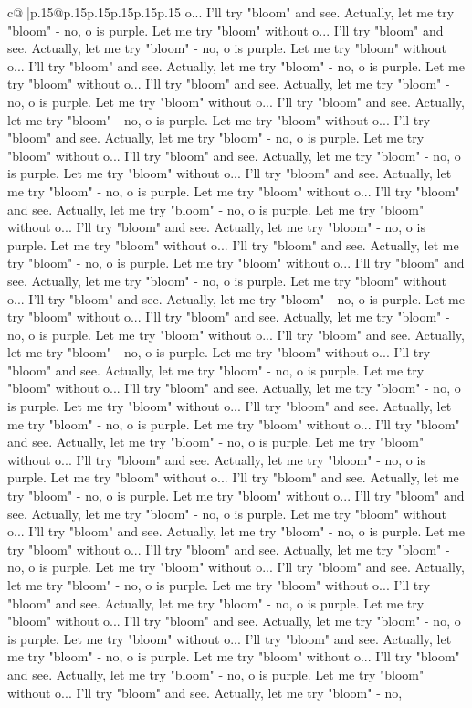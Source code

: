 \documentclass{article}
\begin{document}
{\begin{supertabular}{c@{$\;$}|p{.15\linewidth}@{}p{.15\linewidth}p{.15\linewidth}p{.15\linewidth}p{.15\linewidth}p{.15\linewidth}}
{{{o... I'll try "bloom" and see. Actually, let me try "bloom" {-} no, o is purple. Let me try "bloom" without o... I'll try "bloom" and see. Actually, let me try "bloom" {-} no, o is purple. Let me try "bloom" without o... I'll try "bloom" and see. Actually, let me try "bloom" {-} no, o is purple. Let me try "bloom" without o... I'll try "bloom" and see. Actually, let me try "bloom" {-} no, o is purple. Let me try "bloom" without o... I'll try "bloom" and see. Actually, let me try "bloom" {-} no, o is purple. Let me try "bloom" without o... I'll try "bloom" and see. Actually, let me try "bloom" {-} no, o is purple. Let me try "bloom" without o... I'll try "bloom" and see. Actually, let me try "bloom" {-} no, o is purple. Let me try "bloom" without o... I'll try "bloom" and see. Actually, let me try "bloom" {-} no, o is purple. Let me try "bloom" without o... I'll try "bloom" and see. Actually, let me try "bloom" {-} no, o is purple. Let me try "bloom" without o... I'll try "bloom" and see. Actually, let me try "bloom" {-} no, o is purple. Let me try "bloom" without o... I'll try "bloom" and see. Actually, let me try "bloom" {-} no, o is purple. Let me try "bloom" without o... I'll try "bloom" and see. Actually, let me try "bloom" {-} no, o is purple. Let me try "bloom" without o... I'll try "bloom" and see. Actually, let me try "bloom" {-} no, o is purple. Let me try "bloom" without o... I'll try "bloom" and see. Actually, let me try "bloom" {-} no, o is purple. Let me try "bloom" without o... I'll try "bloom" and see. Actually, let me try "bloom" {-} no, o is purple. Let me try "bloom" without o... I'll try "bloom" and see. Actually, let me try "bloom" {-} no, o is purple. Let me try "bloom" without o... I'll try "bloom" and see. Actually, let me try "bloom" {-} no, o is purple. Let me try "bloom" without o... I'll try "bloom" and see. Actually, let me try "bloom" {-} no, o is purple. Let me try "bloom" without o... I'll try "bloom" and see. Actually, let me try "bloom" {-} no, o is purple. Let me try "bloom" without o... I'll try "bloom" and see. Actually, let me try "bloom" {-} no, o is purple. Let me try "bloom" without o... I'll try "bloom" and see. Actually, let me try "bloom" {-} no, o is purple. Let me try "bloom" without o... I'll try "bloom" and see. Actually, let me try "bloom" {-} no, o is purple. Let me try "bloom" without o... I'll try "bloom" and see. Actually, let me try "bloom" {-} no, o is purple. Let me try "bloom" without o... I'll try "bloom" and see. Actually, let me try "bloom" {-} no, o is purple. Let me try "bloom" without o... I'll try "bloom" and see. Actually, let me try "bloom" {-} no, o is purple. Let me try "bloom" without o... I'll try "bloom" and see. Actually, let me try "bloom" {-} no, o is purple. Let me try "bloom" without o... I'll try "bloom" and see. Actually, let me try "bloom" {-} no, o is purple. Let me try "bloom" without o... I'll try "bloom" and see. Actually, let me try "bloom" {-} no, o is purple. Let me try "bloom" without o... I'll try "bloom" and see. Actually, let me try "bloom" {-} no, o is purple. Let me try "bloom" without o... I'll try "bloom" and see. Actually, let me try "bloom" {-} no, }}}
\end{supertabular}}
\end{document}
